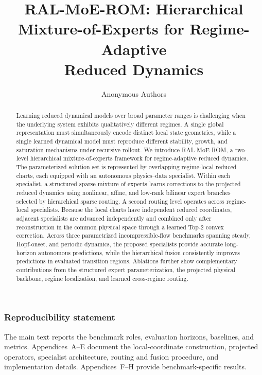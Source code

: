 \documentclass{article}
\title{RAL-MoE-ROM: Hierarchical\\
Mixture-of-Experts for Regime-Adaptive\\
Reduced Dynamics}
\author{Anonymous Authors}
\begin{document}
\maketitle

\begin{abstract}
Learning reduced dynamical models over broad parameter ranges is challenging when the underlying system exhibits qualitatively different regimes. A single global representation must simultaneously encode distinct local state geometries, while a single learned dynamical model must reproduce different stability, growth, and saturation mechanisms under recursive rollout. We introduce RAL-MoE-ROM, a two-level hierarchical mixture-of-experts framework for regime-adaptive reduced dynamics. The parameterized solution set is represented by overlapping regime-local reduced charts, each equipped with an autonomous physics--data specialist. Within each specialist, a structured sparse mixture of experts learns corrections to the projected reduced dynamics using nonlinear, affine, and low-rank bilinear expert branches selected by hierarchical sparse routing. A second routing level operates across regime-local specialists. Because the local charts have independent reduced coordinates, adjacent specialists are advanced independently and combined only after reconstruction in the common physical space through a learned Top-2 convex correction. Across three parametrized incompressible-flow benchmarks spanning steady, Hopf-onset, and periodic dynamics, the proposed specialists provide accurate long-horizon autonomous predictions, while the hierarchical fusion consistently improves predictions in evaluated transition regions. Ablations further show complementary contributions from the structured expert parameterization, the projected physical backbone, regime localization, and learned cross-regime routing.
\end{abstract}





\FloatBarrier



\subsubsection*{Reproducibility statement}
The main text reports the benchmark roles, evaluation horizons, baselines, and metrics. Appendices~A--E document the local-coordinate construction, projected operators, specialist architecture, routing and fusion procedure, and implementation details. Appendices~F--H provide benchmark-specific results.
\end{document}
